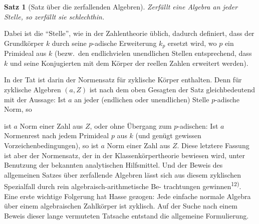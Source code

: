 \documentclass[12pt,a4paper]{article}
\theoremstyle{plain}
\newtheorem*{satz}{Satz}
\begin{document}
\smallskip
\begin{satz}[Satz \"uber die zerfallenden Algebren]
Zerf\"allt eine Algebra an jeder Stelle, so zerf\"allt sie schlechthin.
\end{satz}

\smallskip
\noindent
Dabei ist die ``Stelle'', wie in der Zahlentheorie \"ublich, dadurch definiert,
dass der Grundk\"orper $k$ durch seine $p$-adische Erweiterung $k_p$ ersetzt wird, wo $p$ ein
Primideal aus $k$ (bezw.\ den endlichvielen unendlichen Stellen entsprechend, dass $k$
und seine Konjugierten mit dem K\"orper der reellen Zahlen erweitert werden).

In der Tat ist darin der Normensatz f\"ur zyklische K\"orper enthalten. Denn f\"ur
zyklische Algebren $(a, Z)$ ist nach dem oben Gesagten der Satz gleichbedeutend mit
der Aussage: Ist $a$ an jeder (endlichen oder unendlichen) Stelle $p$-adische Norm, so


\noindent
ist $a$ Norm einer Zahl aus $Z$, oder ohne \"Ubergang zum $p$-adischen: Ist $a$ Normenrest
nach jedem Primideal $p$ aus $k$ (und gen\"ugt gewissen Vorzeichenbedingungen), so ist $a$
Norm einer Zahl aus $Z$. Diese letztere Fassung ist aber der Normensatz, der in der
Klassenk\"orpertheorie bewiesen wird, unter Benutzung der bekannten analytischen
Hilfsmittel. Und der Beweis des allgemeinen Satzes \"uber zerfallende Algebren l\"asst
sich aus diesem zyklischen Spezialfall durch rein algebraisch-arithmetische Be-
trachtungen gewinnen\textsuperscript{12)}. Eine erste wichtige Folgerung hat Hasse gezogen: Jede
einfache normale Algebra \"uber einem algebraischen Zahlk\"orper ist zyklisch. Auf der
Suche nach einem Beweis dieser lange vermuteten Tatsache entstand die allgemeine
Formulierung.
\end{document}
